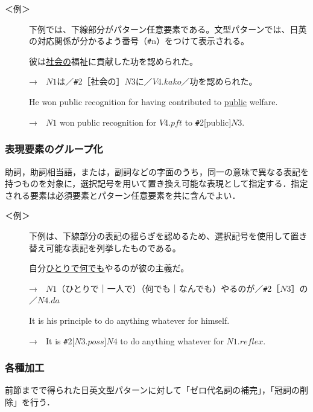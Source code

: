 \documentclass{nlp}
\begin{document}
\begin{description}
\item[＜例＞]下例では、下線部分がパターン任意要素である。文型パターンでは、日英の対応関係が分かるよう番号（\verb|#|n）をつけて表示される。

彼は\underline{社会の}福祉に貢献した功を認められた。

  →　$N1$は／\verb|#|2［社会の］$N3$に／$V4.kako$／功を認められた。

He won public recognition for having contributed to \underline{public} welfare. 

  →　$N1$ won public recognition for $V4.pft$ to \verb|#|2[public]$N3$. 
\end{description}

\subsubsection{表現要素のグループ化}
助詞，助詞相当語，または，副詞などの字面のうち，同一の意味で異なる表記を持つものを対象に，選択記号を用いて置き換え可能な表現として指定する．指定される要素は必須要素とパターン任意要素を共に含んでよい．

\begin{description}
\item[＜例＞]下例は、下線部分の表記の揺らぎを認めるため、選択記号を使用して置き替え可能な表記を列挙したものである。

自分\underline{ひとりで何でも}やるのが彼の主義だ。

  →　$N1$（ひとりで｜一人で）（何でも｜なんでも）やるのが／\verb|#|2［$N3$］の／$N4.da$

It is his principle to do anything whatever for himself.

  →　It is \verb|#|2[$N3.poss$]$N4$ to do anything whatever for $N1.reflex$.
\end{description}

\subsubsection{各種加工}
前節までで得られた日英文型パターンに対して「ゼロ代名詞の補完」，「冠詞の削除」を行う．
\end{document}
